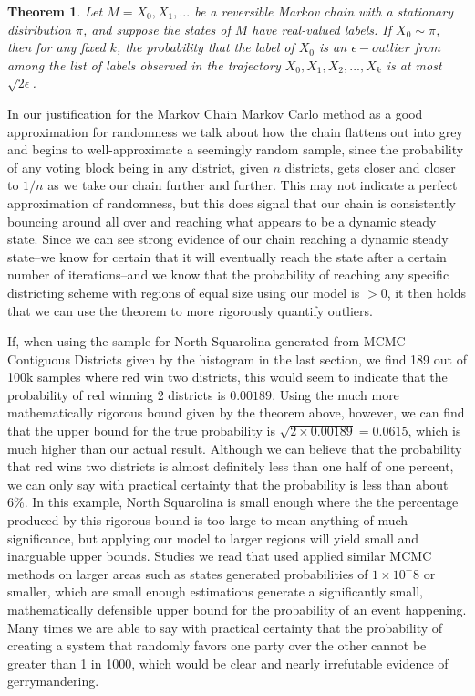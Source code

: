 \documentclass[12pt]{article}
\newtheorem{theorem}{Theorem}[section]
\begin{document}
\begin{theorem} 
Let $M = X_0 , X_1 , ...$ be a reversible Markov chain with a stationary distribution $\pi$, and suppose the states of $M$ have real-valued labels. If $X_0 \sim \pi$, then for any fixed $k$, the probability that the label of $X_0$ is an $\epsilon-outlier$ from among the list of labels observed in the trajectory
$X_0 , X_1 , X_2 , ... , X_k$ is at most $\sqrt{2\epsilon}$.
\end{theorem}

In our justification for the Markov Chain Markov Carlo method as a good approximation for randomness we talk about how the chain flattens out into grey and begins to well-approximate a seemingly random sample, since the probability of any voting block being in any district, given $n$ districts, gets closer and closer to $1/n$ as we take our chain further and further. This may not indicate a perfect approximation of randomness, but this does signal that our chain is consistently bouncing around all over and reaching what appears to be a dynamic steady state. Since we can see strong evidence of our chain reaching a dynamic steady state--we know for certain that it will eventually reach the state after a certain number of iterations--and we know that the probability of reaching any specific districting scheme with regions of equal size using our model is $>0$, it then holds that we can use the theorem to more rigorously quantify outliers.

If, when using the sample for North Squarolina generated from MCMC Contiguous Districts given by the histogram in the last section, we find 189 out of 100k samples where red win two districts, this would seem to indicate that the probability of red winning 2 districts is $0.00189$. Using the much more mathematically rigorous bound given by the theorem above, however, we can find that the upper bound for the true probability is $\sqrt{2\times0.00189} = 0.0615$, which is much higher than our actual result. Although we can believe that the probability that red wins two districts is almost definitely less than one half of one percent, we can only say with practical certainty that the probability is less than about 6\%. In this example, North Squarolina is small enough where the the percentage produced by this rigorous bound is too large to mean anything of much significance, but applying our model to larger regions will yield small and inarguable upper bounds. Studies we read that used applied similar MCMC methods on larger areas such as states generated probabilities of $1\times10^-8$ or smaller, which are small enough estimations generate a significantly small, mathematically defensible upper bound for the probability of an event happening. Many times we are able to say with practical certainty that the probability of creating a system that randomly favors one party over the other cannot be greater than 1 in 1000, which would be clear and nearly irrefutable evidence of gerrymandering.
\end{document}
